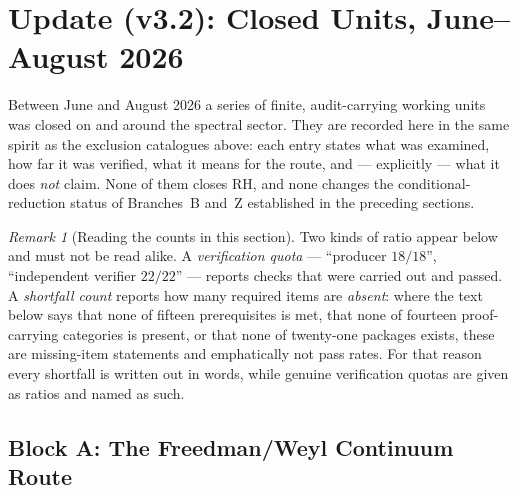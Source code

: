 \documentclass[12pt,a4paper]{article}
\theoremstyle{definition}
\theoremstyle{remark}
\newtheorem{remark}[theorem]{Remark}
\begin{document}
\section{Update (v3.2): Closed Units, June--August 2026}
\label{sec:v32-update}

Between June and August 2026 a series of finite, audit-carrying working
units was closed on and around the spectral sector. They are recorded here
in the same spirit as the exclusion catalogues above: each entry states
what was examined, how far it was verified, what it means for the route,
and --- explicitly --- what it does \emph{not} claim. None of them closes
RH, and none changes the conditional-reduction status of Branches~B and~Z
established in the preceding sections.

\begin{remark}[Reading the counts in this section]
\label{rem:v32-counts}
Two kinds of ratio appear below and must not be read alike. A
\emph{verification quota} --- ``producer $18/18$'', ``independent verifier
$22/22$'' --- reports checks that were carried out and passed. A
\emph{shortfall count} reports how many required items are \emph{absent}:
where the text below says that none of fifteen prerequisites is met, that
none of fourteen proof-carrying categories is present, or that none of
twenty-one packages exists, these are missing-item statements and
emphatically not pass rates. For that reason every shortfall is written
out in words, while genuine verification quotas are given as ratios and
named as such.
\end{remark}

\subsection{Block A: The Freedman/Weyl Continuum Route}
\label{sec:v32-block-a}
\end{document}
